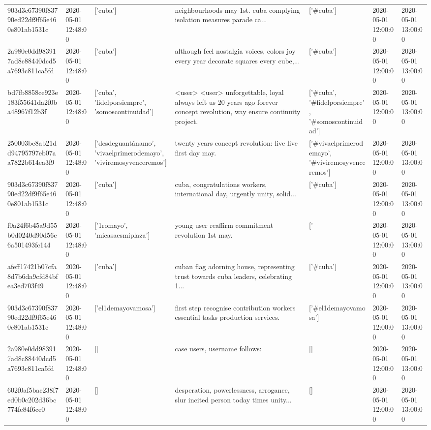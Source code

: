 \begin{tabular}{lllllll}
903d3c67390f83790ed22df9f65e460e801ab1531c & 2020-05-01 12:48:00 & ['cuba'] & neighbourhoods may 1st. cuba complying isolation measures parade ca... & ['#cuba'] & 2020-05-01 12:00:00 & 2020-05-01 13:00:00 \\
2a980e0dd983917ad8c88440dcd5a7693c811ca5fd & 2020-05-01 12:48:00 & ['cuba'] & although feel nostalgia voices, colors joy every year decorate squares every cube,... & ['#cuba'] & 2020-05-01 12:00:00 & 2020-05-01 13:00:00 \\
bd7fb8858ce923e183f55641da2f0ba48967f12b3f & 2020-05-01 12:48:00 & ['cuba', 'fidelporsiempre', 'somoscontinuidad'] & <user> <user> unforgettable, loyal always left us 20 years ago forever concept revolution, way ensure continuity project. & ['#cuba', '#fidelporsiempre', '#somoscontinuidad'] & 2020-05-01 12:00:00 & 2020-05-01 13:00:00 \\
250003be8ab21dd94795797eb07aa7822b614ea3f9 & 2020-05-01 12:48:00 & ['desdeguantánamo', 'vivaelprimerodemayo', 'viviremosyvenceremos'] & twenty years concept revolution: live live first day may. & ['#vivaelprimerodemayo', '#viviremosyvenceremos'] & 2020-05-01 12:00:00 & 2020-05-01 13:00:00 \\
903d3c67390f83790ed22df9f65e460e801ab1531c & 2020-05-01 12:48:00 & ['cuba'] & cuba, congratulations workers, international day, urgently unity, solid... & ['#cuba'] & 2020-05-01 12:00:00 & 2020-05-01 13:00:00 \\
f0a24f6b45a9d55b0d0240d90d56c6a501493fc144 & 2020-05-01 12:48:00 & ['1romayo', 'micasaesmiplaza'] & young user reaffirm commitment revolution 1st may. & ['#1romayo', '#micasaesmiplaza'] & 2020-05-01 12:00:00 & 2020-05-01 13:00:00 \\
afeff17421b07cfa8d7b6da9cfd84bfea3ed703f49 & 2020-05-01 12:48:00 & ['cuba'] & cuban flag adorning house, representing trust towards cuba leaders, celebrating 1... & ['#cuba'] & 2020-05-01 12:00:00 & 2020-05-01 13:00:00 \\
903d3c67390f83790ed22df9f65e460e801ab1531c & 2020-05-01 12:48:00 & ['el1demayovamosa'] & first step recognise contribution workers essential tasks production services. & ['#el1demayovamosa'] & 2020-05-01 12:00:00 & 2020-05-01 13:00:00 \\
2a980e0dd983917ad8c88440dcd5a7693c811ca5fd & 2020-05-01 12:48:00 & [] & case users, username follows: & [] & 2020-05-01 12:00:00 & 2020-05-01 13:00:00 \\
602f0af5bac238f7ed0b0c202d36bc774fe84f6ce0 & 2020-05-01 12:48:00 & [] & desperation, powerlessness, arrogance, slur incited person today times unity... & [] & 2020-05-01 12:00:00 & 2020-05-01 13:00:00 \\

\end{tabular}
